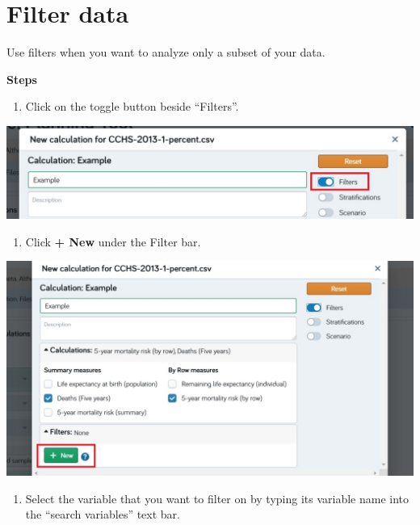 \documentclass[]{book}
\providecommand{\tightlist}{%
  \setlength{\itemsep}{0pt}\setlength{\parskip}{0pt}}
\begin{document}
\section{Filter data}\label{filter-data}

Use filters when you want to analyze only a subset of your data.

\textbf{Steps}

\begin{enumerate}
\def\labelenumi{\arabic{enumi}.}
\tightlist
\item
  Click on the toggle button beside ``Filters''.
\end{enumerate}

\begin{center}\includegraphics{Images/Filter} \end{center}

\begin{enumerate}
\def\labelenumi{\arabic{enumi}.}
\setcounter{enumi}{1}
\tightlist
\item
  Click \textbf{+ New} under the Filter bar.
\end{enumerate}

\begin{center}\includegraphics{Images/FilterSelect} \end{center}

\begin{enumerate}
\def\labelenumi{\arabic{enumi}.}
\setcounter{enumi}{2}
\tightlist
\item
  Select the variable that you want to filter on by typing its variable
  name into the ``search variables'' text bar.
\end{enumerate}
\end{document}
